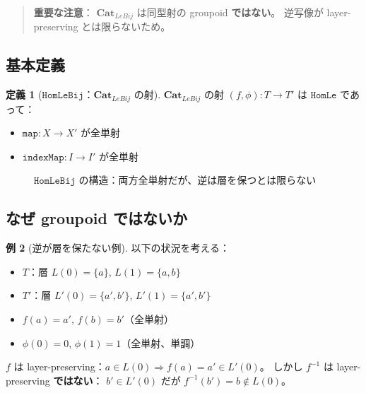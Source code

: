 \documentclass{ltjsarticle}
\theoremstyle{definition}
\newtheorem{definition}{定義}[section]
\newtheorem{example}[definition]{例}
\newcommand{\catlebij}{\mathbf{Cat}_{LeBij}}
\newcommand{\HomLe}{\mathtt{HomLe}}
\newcommand{\HomLeBij}{\mathtt{HomLeBij}}
\newcommand{\indexMap}{\mathtt{indexMap}}
\begin{document}
\begin{quote}
\textbf{重要な注意}：
$\catlebij$ は同型射の groupoid \textbf{ではない}。
逆写像が layer-preserving とは限らないため。
\end{quote}

\subsection{基本定義}

\begin{definition}[$\HomLeBij$：$\catlebij$ の射]
\label{def:hom-le-bij}
$\catlebij$ の射 $(f, \phi) : T \to T'$ は $\HomLe$ であって：
\begin{itemize}
  \item $\mathtt{map} : X \to X'$ が全単射
  \item $\indexMap : I \to I'$ が全単射
\end{itemize}
\end{definition}

\begin{figure}[htbp]
\centering
{}
\caption{$\HomLeBij$ の構造：両方全単射だが、逆は層を保つとは限らない}
\label{fig:hom-le-bij}
\end{figure}

\subsection{なぜ groupoid ではないか}

\begin{example}[逆が層を保たない例]
以下の状況を考える：
\begin{itemize}
  \item $T$：層 $L(0) = \{a\}$, $L(1) = \{a, b\}$
  \item $T'$：層 $L'(0) = \{a', b'\}$, $L'(1) = \{a', b'\}$
  \item $f(a) = a'$, $f(b) = b'$（全単射）
  \item $\phi(0) = 0$, $\phi(1) = 1$（全単射、単調）
\end{itemize}
$f$ は layer-preserving：$a \in L(0) \Rightarrow f(a) = a' \in L'(0)$。
しかし $f^{-1}$ は layer-preserving \textbf{ではない}：
$b' \in L'(0)$ だが $f^{-1}(b') = b \notin L(0)$。
\end{example}
\end{document}
